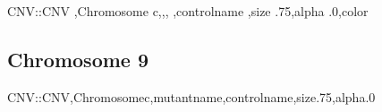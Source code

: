 \documentclass[letterpaper,10pt,english]{sphinxhowto}
\begin{document}
\subsection{}
\label{\detokenize{CNV:sorghum-cnv}}
\begin{sphinxVerbatim}[commandchars=\\\{\}]
CNV::CNV  ,Chromosome  c,,,
  ,controlname  ,size  .75,alpha  .0,color
\end{sphinxVerbatim}

\begin{figure}[htbp]
\centering

\noindent{}
\end{figure}


\subsection{Chromosome 9}
\label{\detokenize{CNV:chromosome-9}}
\begin{sphinxVerbatim}[commandchars=\\\{\}]
CNV::CNV,Chromosomec,mutantname,controlname,size.75,alpha.0
\end{sphinxVerbatim}

\begin{figure}[htbp]
\centering

\noindent{}
\end{figure}



\renewcommand{\indexname}{Index}
\printindex
\end{document}
